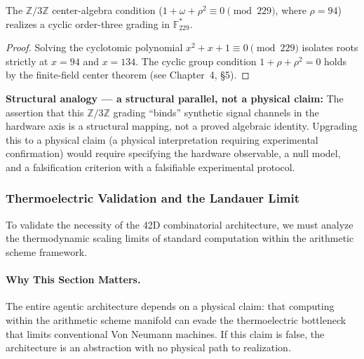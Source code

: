 \begin{theorem}
The $\mathbb{Z}/3\mathbb{Z}$ center-algebra condition ($1 + \omega + \rho^2 \equiv 0 \pmod{229}$, where $\rho = 94$) realizes a cyclic order-three grading in $\mathbb{F}_{229}^*$.
\end{theorem}
\begin{proof}
Solving the cyclotomic polynomial $x^2 + x + 1 \equiv 0 \pmod{229}$ isolates roots strictly at $x = 94$ and $x = 134$. The cyclic group condition $1 + \rho + \rho^2 = 0$ holds by the finite-field center theorem (see Chapter~4, \S5). \qedhere
\end{proof}

\textbf{Structural analogy --- a structural parallel, not a physical claim:} The assertion that this $\mathbb{Z}/3\mathbb{Z}$ grading ``binds'' synthetic signal channels in the hardware axis is a structural mapping, not a proved algebraic identity. Upgrading this to a physical claim (a physical interpretation requiring experimental confirmation) would require specifying the hardware observable, a null model, and a falsification criterion with a falsifiable experimental protocol.

\subsubsection{Thermoelectric Validation and the Landauer Limit}

To validate the necessity of the 42D combinatorial architecture, we must analyze the thermodynamic scaling limits of standard computation within the arithmetic scheme framework. 

\paragraph{Why This Section Matters.}
The entire agentic architecture depends on a physical claim: that computing within the arithmetic scheme manifold can evade the thermoelectric bottleneck that limits conventional Von Neumann machines. If this claim is false, the architecture is an abstraction with no physical path to realization.

